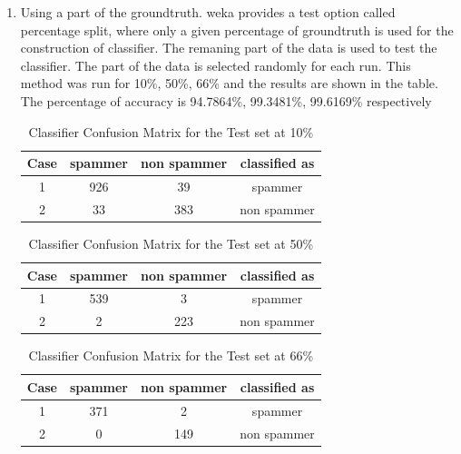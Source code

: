 \documentclass[11pt]{article}
\begin{document}
\begin{enumerate}
\item Using a part of the groundtruth. weka provides a test option called percentage split, where only a given percentage of groundtruth is used for the construction of classifier. The remaning part of the data is used to test the classifier. The part of the data is selected randomly for each run. This method was run for 10\%, 50\%, 66\% and the results are shown in the table. The percentage of accuracy is 94.7864\%,  99.3481\%, 99.6169\% respectively


\begin{table}[ht] 
\caption{Classifier Confusion Matrix for the Test set at 10\%} %
\centering %
\begin{tabular}{c c c c} %
\hline\hline %
Case & spammer & non spammer & classified as \\ [0.5ex] %
\hline %
1 & 926 & 39 & spammer \\ %
2 & 33 & 383 & non spammer \\ [1ex] %
\hline %
\end{tabular} 
\label{table:nonlin} %
\end{table}


\begin{table}[ht] 
\caption{Classifier Confusion Matrix for the Test set at 50\%} %
\centering %
\begin{tabular}{c c c c} %
\hline\hline %
Case & spammer & non spammer & classified as \\ [0.5ex] %
\hline %
1 & 539 & 3 & spammer \\ %
2 & 2 & 223 & non spammer \\ [1ex] %
\hline %
\end{tabular} 
\label{table:nonlin} %
\end{table}

\begin{table}[ht] 
\caption{Classifier Confusion Matrix for the Test set at 66\%} %
\centering %
\begin{tabular}{c c c c} %
\hline\hline %
Case & spammer & non spammer & classified as \\ [0.5ex] %
\hline %
1 & 371 & 2 & spammer \\ %
2 & 0 & 149 & non spammer \\ [1ex] %
\hline %
\end{tabular} 
\label{table:nonlin} %
\end{table}


\end{enumerate}
\end{document}
